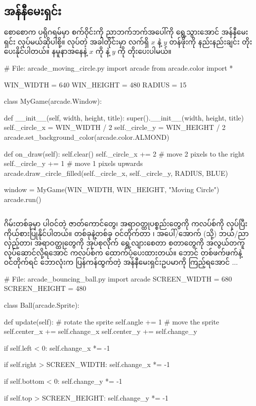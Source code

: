 \subsection*{အန်နီမေးရှင်း}
စောစောက ပရိုဂရမ်မှာ စက်ဝိုင်းကို ညာဘက်ဘက်အပေါ်ကို ရွေ့သွားအောင် အန်နီမေးရှင်း လုပ်မယ်ဆိုပါစို့။  လုပ်တဲ့ အခါတိုင်းမှာ လက်ရှိ $x$ နဲ့ $y$ တန်ဖိုးကို နည်းနည်းချင်း တိုးပေးနိုင်ပါတယ်။ နမူနာအနေနဲ့ $x$ ကို  နဲ့ $y$ ကို  တိုးပေးပါမယ်။
%
\begin{py}
# File: arcade_moving_circle.py
import arcade
from arcade.color import *

WIN_WIDTH = 640
WIN_HEIGHT = 480
RADIUS = 15


class MyGame(arcade.Window):

    def __init__(self, width, height, title):
        super().__init__(width, height, title)
        self._circle_x = WIN_WIDTH / 2
        self._circle_y = WIN_HEIGHT / 2
        arcade.set_background_color(arcade.color.ALMOND)

    def on_draw(self):
        self.clear()
        self._circle_x += 2     # move 2 pixels to the right
        self._circle_y += 1     # move 1 pixels upwards
        arcade.draw_circle_filled(self._circle_x,
                                  self._circle_y,
                                  RADIUS,
                                  BLUE)


window = MyGame(WIN_WIDTH, WIN_HEIGHT, "Moving Circle")
arcade.run()
\end{py}
%


\subsection*{}
ဂိမ်းတစ်ခုမှာ ပါဝင်တဲ့ ဇာတ်ကောင်တွေ၊ အရာဝတ္ထုပစ္စည်းတွေကို  ကလပ်စ်ကို   လုပ်ပြီး ကိုယ်စားပြုနိုင်ပါတယ်။ တစ်ခုနဲ့တစ်ခု ဝင်တိုက်တာ  ၊  အပေါ်/အောက် (သို့) ဘယ်/ညာလှည့်တာ၊  အရာဝတ္ထုတွေကို အုပ်စုလိုက် ရွေ့လျားစေတာ စတာတွေကို အလွယ်တကူ လုပ်ဆောင်လို့ရအောင်  ကလပ်စ်က ထောက်ပံ့ပေးထားတယ်။  ဘောင် တစ်ဖက်ဖက်နဲ့ ဝင်တိုက်ရင် ဘောလုံးက ပြန်ကန်ထွက်တဲ့ အန်နီမေးရှင်းဥပမာကို ကြည့်ရအောင် $\ldots$
%
\begin{py}
# File: arcade_bouncing_ball.py
import arcade
SCREEN_WIDTH = 680
SCREEN_HEIGHT = 480


class Ball(arcade.Sprite):

    def update(self):
        # rotate the sprite
        self.angle += 1
        # move the sprite
        self.center_x += self.change_x
        self.center_y += self.change_y

        if self.left < 0:
            self.change_x *= -1

        if self.right > SCREEN_WIDTH:
            self.change_x *= -1

        if self.bottom < 0:
            self.change_y *= -1

        if self.top > SCREEN_HEIGHT:
            self.change_y *= -1
\end{py}
%

